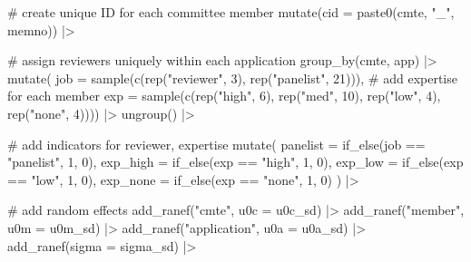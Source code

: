 \documentclass[
  letterpaper,
  DIV=11,
  numbers=noendperiod]{scrartcl}
\newenvironment{Shaded}{\begin{snugshade}}{\end{snugshade}}
\newcommand{\AttributeTok}[1]{\textcolor[rgb]{0.40,0.45,0.13}{#1}}
\newcommand{\CommentTok}[1]{\textcolor[rgb]{0.37,0.37,0.37}{#1}}
\newcommand{\DecValTok}[1]{\textcolor[rgb]{0.68,0.00,0.00}{#1}}
\newcommand{\FunctionTok}[1]{\textcolor[rgb]{0.28,0.35,0.67}{#1}}
\newcommand{\NormalTok}[1]{\textcolor[rgb]{0.00,0.23,0.31}{#1}}
\newcommand{\SpecialCharTok}[1]{\textcolor[rgb]{0.37,0.37,0.37}{#1}}
\newcommand{\StringTok}[1]{\textcolor[rgb]{0.13,0.47,0.30}{#1}}
\begin{document}
\begin{Shaded}
\begin{Highlighting}[]
  \CommentTok{\# create unique ID for each committee member}
  \FunctionTok{mutate}\NormalTok{(}\AttributeTok{cid =} \FunctionTok{paste0}\NormalTok{(cmte, }\StringTok{"\_"}\NormalTok{, memno)) }\SpecialCharTok{|\textgreater{}}
 
  \CommentTok{\# assign reviewers uniquely within each application}
  \FunctionTok{group\_by}\NormalTok{(cmte, app) }\SpecialCharTok{|\textgreater{}}
  \FunctionTok{mutate}\NormalTok{(}
    \AttributeTok{job =} \FunctionTok{sample}\NormalTok{(}\FunctionTok{c}\NormalTok{(}\FunctionTok{rep}\NormalTok{(}\StringTok{"reviewer"}\NormalTok{, }\DecValTok{3}\NormalTok{), }
      \FunctionTok{rep}\NormalTok{(}\StringTok{"panelist"}\NormalTok{, }\DecValTok{21}\NormalTok{))),}
    \CommentTok{\# add expertise for each member}
    \AttributeTok{exp =} \FunctionTok{sample}\NormalTok{(}\FunctionTok{c}\NormalTok{(}\FunctionTok{rep}\NormalTok{(}\StringTok{"high"}\NormalTok{, }\DecValTok{6}\NormalTok{), }
      \FunctionTok{rep}\NormalTok{(}\StringTok{"med"}\NormalTok{, }\DecValTok{10}\NormalTok{), }\FunctionTok{rep}\NormalTok{(}\StringTok{"low"}\NormalTok{, }\DecValTok{4}\NormalTok{),}
      \FunctionTok{rep}\NormalTok{(}\StringTok{"none"}\NormalTok{, }\DecValTok{4}\NormalTok{)))) }\SpecialCharTok{|\textgreater{}}
  \FunctionTok{ungroup}\NormalTok{() }\SpecialCharTok{|\textgreater{}}
  
  \CommentTok{\# add indicators for reviewer, expertise}
  \FunctionTok{mutate}\NormalTok{(}
    \AttributeTok{panelist =} \FunctionTok{if\_else}\NormalTok{(job }\SpecialCharTok{==} \StringTok{"panelist"}\NormalTok{, }\DecValTok{1}\NormalTok{, }\DecValTok{0}\NormalTok{),}
    \AttributeTok{exp\_high =} \FunctionTok{if\_else}\NormalTok{(exp }\SpecialCharTok{==} \StringTok{"high"}\NormalTok{, }\DecValTok{1}\NormalTok{, }\DecValTok{0}\NormalTok{),}
    \AttributeTok{exp\_low =} \FunctionTok{if\_else}\NormalTok{(exp }\SpecialCharTok{==} \StringTok{"low"}\NormalTok{, }\DecValTok{1}\NormalTok{, }\DecValTok{0}\NormalTok{),}
    \AttributeTok{exp\_none =} \FunctionTok{if\_else}\NormalTok{(exp }\SpecialCharTok{==} \StringTok{"none"}\NormalTok{, }\DecValTok{1}\NormalTok{, }\DecValTok{0}\NormalTok{)}
\NormalTok{  ) }\SpecialCharTok{|\textgreater{}}
  
  \CommentTok{\# add random effects }
  \FunctionTok{add\_ranef}\NormalTok{(}\StringTok{"cmte"}\NormalTok{, }\AttributeTok{u0c =}\NormalTok{ u0c\_sd) }\SpecialCharTok{|\textgreater{}}
  \FunctionTok{add\_ranef}\NormalTok{(}\StringTok{"member"}\NormalTok{, }\AttributeTok{u0m =}\NormalTok{ u0m\_sd) }\SpecialCharTok{|\textgreater{}}
  \FunctionTok{add\_ranef}\NormalTok{(}\StringTok{"application"}\NormalTok{, }\AttributeTok{u0a =}\NormalTok{ u0a\_sd) }\SpecialCharTok{|\textgreater{}}
  \FunctionTok{add\_ranef}\NormalTok{(}\AttributeTok{sigma =}\NormalTok{ sigma\_sd) }\SpecialCharTok{|\textgreater{}}


\end{Highlighting}
\end{Shaded}
\end{document}
